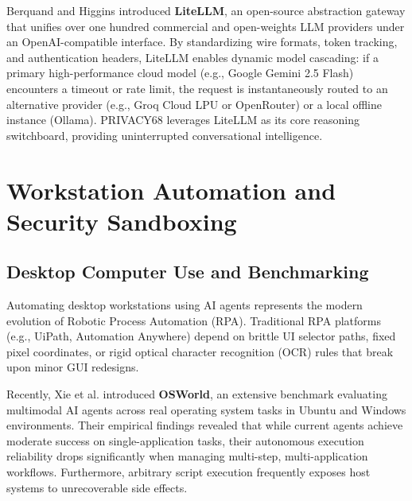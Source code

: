 Berquand and Higgins \cite{litellm2024} introduced \textbf{LiteLLM}, an open-source abstraction gateway that unifies over one hundred commercial and open-weights LLM providers under an OpenAI-compatible interface. By standardizing wire formats, token tracking, and authentication headers, LiteLLM enables dynamic model cascading: if a primary high-performance cloud model (e.g., Google Gemini 2.5 Flash) encounters a timeout or rate limit, the request is instantaneously routed to an alternative provider (e.g., Groq Cloud LPU or OpenRouter) or a local offline instance (Ollama). PRIVACY68 leverages LiteLLM as its core reasoning switchboard, providing uninterrupted conversational intelligence.

\section{Workstation Automation and Security Sandboxing}

\subsection{Desktop Computer Use and Benchmarking}
Automating desktop workstations using AI agents represents the modern evolution of Robotic Process Automation (RPA). Traditional RPA platforms (e.g., UiPath, Automation Anywhere) depend on brittle UI selector paths, fixed pixel coordinates, or rigid optical character recognition (OCR) rules that break upon minor GUI redesigns.

Recently, Xie et al. \cite{xie2024osworld} introduced \textbf{OSWorld}, an extensive benchmark evaluating multimodal AI agents across real operating system tasks in Ubuntu and Windows environments. Their empirical findings revealed that while current agents achieve moderate success on single-application tasks, their autonomous execution reliability drops significantly when managing multi-step, multi-application workflows. Furthermore, arbitrary script execution frequently exposes host systems to unrecoverable side effects.

